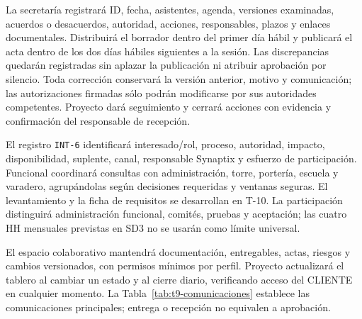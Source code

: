 La secretaría registrará ID, fecha, asistentes, agenda, versiones examinadas, acuerdos o desacuerdos, autoridad, acciones, responsables, plazos y enlaces documentales. Distribuirá el borrador dentro del primer día hábil y publicará el acta dentro de los dos días hábiles siguientes a la sesión. Las discrepancias quedarán registradas sin aplazar la publicación ni atribuir aprobación por silencio. Toda corrección conservará la versión anterior, motivo y comunicación; las autorizaciones firmadas sólo podrán modificarse por sus autoridades competentes. Proyecto dará seguimiento y cerrará acciones con evidencia y confirmación del responsable de recepción.

El registro \texttt{INT-6} identificará interesado/rol, proceso, autoridad, impacto, disponibilidad, suplente, canal, responsable Synaptix y esfuerzo de participación. Funcional coordinará consultas con administración, torre, portería, escuela y varadero, agrupándolas según decisiones requeridas y ventanas seguras. El levantamiento y la ficha de requisitos se desarrollan en T-10. La participación distinguirá administración funcional, comités, pruebas y aceptación; las cuatro HH mensuales previstas en SD3 no se usarán como límite universal. \parencite[numerales 13.1--13.3, pp.~28--30]{sd6-c07}

El espacio colaborativo mantendrá documentación, entregables, actas, riesgos y cambios versionados, con permisos mínimos por perfil. Proyecto actualizará el tablero al cambiar un estado y al cierre diario, verificando acceso del CLIENTE en cualquier momento. La Tabla~\ref{tab:t9-comunicaciones} establece las comunicaciones principales; entrega o recepción no equivalen a aprobación. \parencite[RT-19.05/06/08, pp.~33--34]{sd6-bt}

